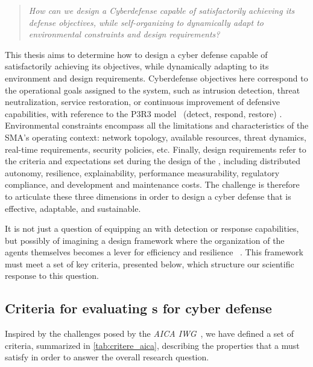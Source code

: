\begin{quote}
  \emph{How can we design a Cyberdefense  capable of satisfactorily achieving its defense objectives, while self-organizing to dynamically adapt to environmental constraints and design requirements?}
\end{quote}

\medskip

This thesis aims to determine how to design a cyber defense  capable of satisfactorily achieving its objectives, while dynamically adapting to its environment and design requirements. Cyberdefense objectives here correspond to the operational goals assigned to the system, such as intrusion detection, threat neutralization, service restoration, or continuous improvement of defensive capabilities, with reference to the P3R3 model~\cite{Theron2013P3R3} (detect, respond, restore) . Environmental constraints encompass all the limitations and characteristics of the SMA's operating context: network topology, available resources, threat dynamics, real-time requirements, security policies, etc. Finally, design requirements refer to the criteria and expectations set during the design of the , including distributed autonomy, resilience, explainability, performance measurability, regulatory compliance, and development and maintenance costs. The challenge is therefore to articulate these three dimensions in order to design a cyber defense  that is effective, adaptable, and sustainable.

\medskip

\noindent
It is not just a question of equipping an  with detection or response capabilities, but possibly of imagining a design framework where the organization of the agents themselves becomes a lever for efficiency and resilience~\cite{Picard2006, DiMarzoSerugendo2006} . This framework must meet a set of key criteria, presented below, which structure our scientific response to this question.

\subsection*{Criteria for evaluating s for cyber defense}\label{sec:criteria-evaluation}

Inspired by the challenges posed by the \textit{AICA IWG}~\footnotemark[3], we have defined a set of criteria, summarized in \autoref{tab:critere_aica}, describing the properties that a  must satisfy in order to answer the overall research question.


